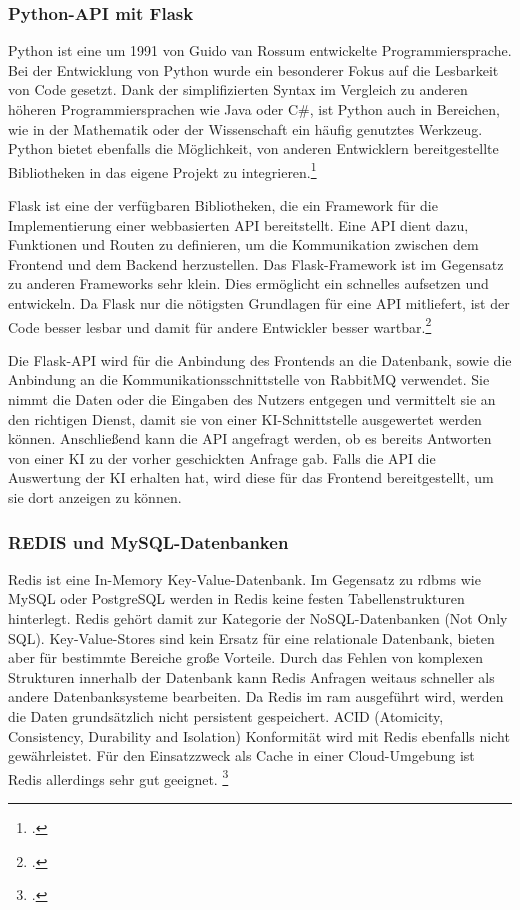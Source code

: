 \subsubsection{Python-API mit Flask}
Python ist eine um 1991 von Guido van Rossum entwickelte Programmiersprache. Bei der Entwicklung von Python wurde ein besonderer Fokus auf die Lesbarkeit von Code gesetzt. Dank der simplifizierten Syntax im Vergleich zu anderen höheren Programmiersprachen wie Java oder C\#, ist Python auch in Bereichen, wie in der Mathematik oder der Wissenschaft ein häufig genutztes Werkzeug. Python bietet ebenfalls die Möglichkeit, von anderen Entwicklern bereitgestellte Bibliotheken in das eigene Projekt zu integrieren.\footcite{python2021python} 

Flask ist eine der verfügbaren Bibliotheken, die ein Framework für die Implementierung einer webbasierten API bereitstellt. Eine API dient dazu, Funktionen und Routen zu definieren, um die Kommunikation zwischen dem Frontend und dem Backend herzustellen. Das Flask-Framework ist im Gegensatz zu anderen Frameworks sehr klein. Dies ermöglicht ein schnelles aufsetzen und entwickeln. Da Flask nur die nötigsten Grundlagen für eine API mitliefert, ist der Code besser lesbar und damit für andere Entwickler besser wartbar.\footcite{grinberg2018flask} 

Die Flask-API wird für die Anbindung des Frontends an die Datenbank, sowie die Anbindung an die Kommunikationsschnittstelle von RabbitMQ verwendet. Sie nimmt die Daten oder die Eingaben des Nutzers entgegen und vermittelt sie an den richtigen Dienst, damit sie von einer KI-Schnittstelle ausgewertet werden können. Anschließend kann die API angefragt werden, ob es bereits Antworten von einer KI zu der vorher geschickten Anfrage gab. Falls die API die Auswertung der KI erhalten hat, wird diese für das Frontend bereitgestellt, um sie dort anzeigen zu können.  

\subsubsection{REDIS und MySQL-Datenbanken}
Redis ist eine In-Memory Key-Value-Datenbank. Im Gegensatz zu \ac{rdbms} wie MySQL oder PostgreSQL werden in Redis keine festen Tabellenstrukturen hinterlegt. Redis gehört damit zur Kategorie der NoSQL-Datenbanken (Not Only SQL). Key-Value-Stores sind kein Ersatz für eine relationale Datenbank, bieten aber für bestimmte Bereiche große Vorteile. Durch das Fehlen von komplexen Strukturen innerhalb der Datenbank kann Redis Anfragen weitaus schneller als andere Datenbanksysteme bearbeiten. Da Redis im \ac{ram} ausgeführt wird,  werden die Daten grundsätzlich nicht persistent gespeichert. ACID (Atomicity, Consistency, Durability and Isolation) Konformität wird mit Redis ebenfalls nicht gewährleistet. Für den Einsatzzweck als Cache in einer Cloud-Umgebung ist Redis allerdings sehr gut geeignet. \footcite{paksula2010persisting}

